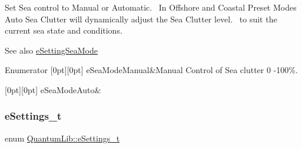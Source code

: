 Set Sea control to Manual or Automatic.~\newline
In Offshore and Coastal Preset Modes Auto Sea Clutter will dynamically adjust the Sea Clutter level.~\newline
to suit the current sea state and conditions. \begin{DoxySeeAlso}{See also}
\mbox{\hyperlink{namespace_quantum_lib_acc8124e3e65bca4aa798d03a55e3d54ca593e70f6a28f2906edb5f75d295ec657}{e\+Setting\+Sea\+Mode}} 
\end{DoxySeeAlso}
\begin{DoxyEnumFields}{Enumerator}
[0pt][0pt]{}\mbox{\label{namespace_quantum_lib_a66c359df4d1d3895303ab24910200c8da0585658ded88f8f99b0f1ced1edcb4b5}} 
e\+Sea\+Mode\+Manual&Manual Control of Sea clutter 0 -\/100\%. \\
\hline

[0pt][0pt]{}\mbox{\label{namespace_quantum_lib_a66c359df4d1d3895303ab24910200c8da4a8466cfd9643d6fa118b7819f06a34f}} 
e\+Sea\+Mode\+Auto&\\
\hline

\end{DoxyEnumFields}
\mbox{\label{namespace_quantum_lib_acc8124e3e65bca4aa798d03a55e3d54c}} 
\subsubsection{\texorpdfstring{e\+Settings\+\_\+t}{eSettings\_t}}
{\footnotesize\ttfamily enum \mbox{\hyperlink{namespace_quantum_lib_acc8124e3e65bca4aa798d03a55e3d54c}{Quantum\+Lib\+::e\+Settings\+\_\+t}}}

